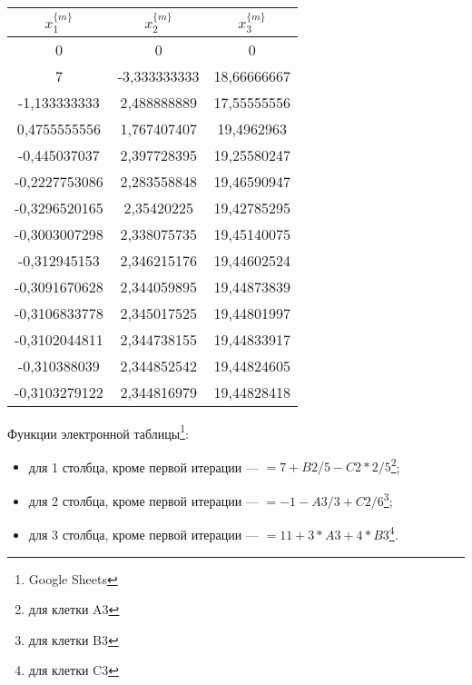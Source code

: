 \documentclass[10pt, a4paper, titlepage]{article}
\begin{document}
\begin{center}
    \begin{tabular}{|c|c|c|}
        \hline
        $x_1^{\{m\}}$ & $x_2^{\{m\}}$ & $x_3^{\{m\}}$ \\ \hline
        
        0 & 0 & 0 \\ \hline
        
        7 & -3,333333333 & 18,66666667 \\ \hline
        
        -1,133333333 & 2,488888889 & 17,55555556 \\ \hline
        
        0,4755555556 & 1,767407407 & 19,4962963 \\ \hline
        
        -0,445037037 & 2,397728395 & 19,25580247 \\ \hline
        
        -0,2227753086 & 2,283558848 & 19,46590947 \\ \hline
        
        -0,3296520165 & 2,35420225 & 19,42785295 \\ \hline
        
        -0,3003007298 & 2,338075735 & 19,45140075 \\ \hline
        
        -0,312945153 & 2,346215176 & 19,44602524 \\ \hline
        
        -0,3091670628 & 2,344059895 & 19,44873839 \\ \hline
        
        -0,3106833778 & 2,345017525 & 19,44801997 \\ \hline
        
        -0,3102044811 & 2,344738155 & 19,44833917 \\ \hline
        
        -0,310388039 & 2,344852542 & 19,44824605 \\ \hline
        
        -0,3103279122 & 2,344816979 & 19,44828418 \\ \hline
        
    \end{tabular}
\end{center}

Функции электронной таблицы\footnote{Google Sheets}:
\begin{itemize}
    \item для 1 столбца, кроме первой итерации --- $=7+B2/5-C2*2/5$\footnote{для клетки A3};
    
    \item для 2 столбца, кроме первой итерации  --- $=-1-A3/3+C2/6$\footnote{для клетки B3};
    
    \item для 3 столбца, кроме первой итерации --- $=11+3*A3+4*B3$\footnote{для клетки C3}.
    
\end{itemize}
\end{document}
